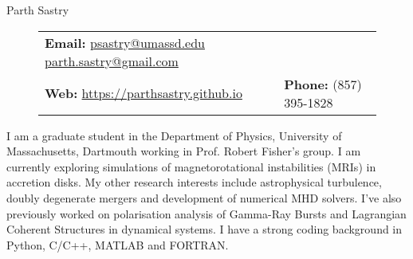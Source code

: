 {
{\Large Parth Sastry}
\begin{figure}[h]
    \centering
    \begin{tabular}{p{} p{}}
        \textbf{Email: } \href{mailto:psastry@umassd.edu}{psastry@umassd.edu}       \href{mailto:parth.sastry@gmail.com}{parth.sastry@gmail.com}   &  \\
        \textbf{Web: } \href{https://parthsastry.github.io}{https://parthsastry.github.io} & \textbf{Phone: } (857) 395-1828 \\
    \end{tabular}        
\end{figure}

\renewcommand{\arraystretch}{1.5}

\begin{flushleft}
    I am a graduate student in the Department of Physics, University of Massachusetts, Dartmouth working in Prof. Robert Fisher's group. I am currently exploring simulations of magnetorotational instabilities (MRIs) in accretion disks. My other research interests include astrophysical turbulence, doubly degenerate mergers and development of numerical MHD solvers. I've also previously worked on polarisation analysis of Gamma-Ray Bursts and Lagrangian Coherent Structures in dynamical systems. I have a strong coding background in Python, C/C++, MATLAB and FORTRAN.
\end{flushleft}
} %